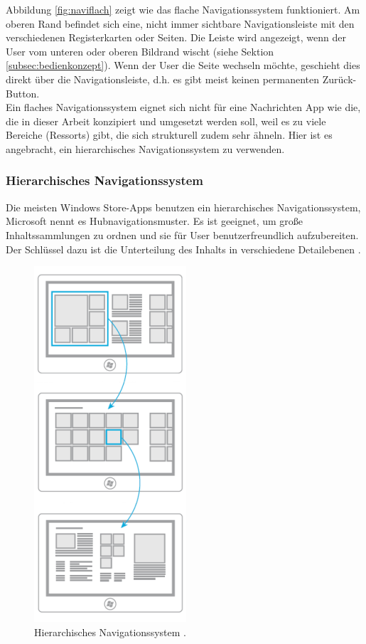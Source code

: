 \documentclass[12pt,a4paper,bibtotoc,abstracton]{scrartcl}
\begin{document}
Abbildung \ref{fig:naviflach} zeigt wie das flache Navigationssystem funktioniert. Am oberen Rand befindet sich eine, nicht immer sichtbare Navigationsleiste mit den verschiedenen Registerkarten oder Seiten. Die Leiste wird angezeigt, wenn der User vom unteren oder oberen Bildrand wischt (siehe Sektion \ref{subsec:bedienkonzept}). Wenn der User die Seite wechseln möchte, geschieht dies  direkt über die Navigationsleiste, d.h. es gibt meist keinen permanenten Zurück-Button. \\
Ein flaches Navigationssystem eignet sich nicht für eine Nachrichten App wie die, die in dieser Arbeit konzipiert und umgesetzt werden soll, weil es zu viele Bereiche (Ressorts) gibt, die sich strukturell zudem sehr ähneln. Hier ist es angebracht, ein hierarchisches Navigationssystem zu verwenden.    


\subsubsection{Hierarchisches Navigationssystem}
\label{subsubsec:hierachischessystem}
Die meisten Windows Store-Apps benutzen ein hierarchisches Navigationssystem, Microsoft nennt es Hubnavigationsmuster. Es ist geeignet, um große Inhaltssammlungen zu ordnen und sie für User benutzerfreundlich aufzubereiten. Der Schlüssel dazu ist die Unterteilung des Inhalts in verschiedene Detailebenen \citep{MicrosoftNavidesign2013}.

\begin{figure}[h]	
	\centering
	\includegraphics[scale=1]{Bilder/Abbildungen/ms_navigation_hierarchie} 
	\caption{Hierarchisches Navigationssystem \protect\citep{MicrosoftNavidesign2013}.}
	\label{fig:navihierarchisch}
\end{figure}
\end{document}
